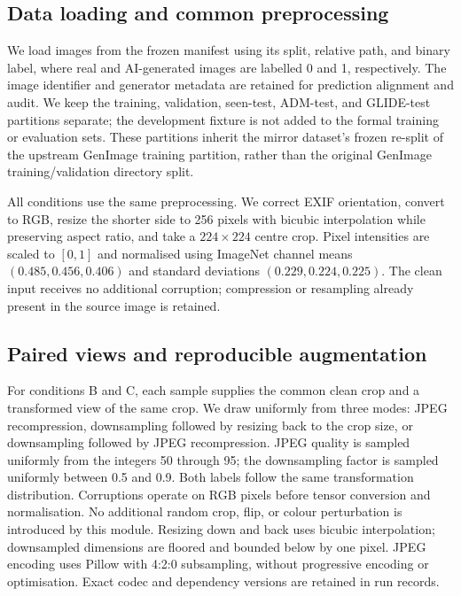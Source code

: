 
\subsection{Data loading and common preprocessing}
\label{sec:ouyang-data}
We load images from the frozen manifest using its split, relative path, and
binary label, where real and AI-generated images are labelled 0 and 1,
respectively. The image identifier and generator metadata are retained for
prediction alignment and audit. We keep the training, validation, seen-test,
ADM-test, and GLIDE-test partitions separate; the development fixture is not
added to the formal training or evaluation sets. These partitions inherit the
mirror dataset's frozen re-split of the upstream GenImage training partition,
rather than the original GenImage training/validation directory split.

All conditions use the same preprocessing. We correct EXIF orientation,
convert to RGB, resize the shorter side to 256 pixels with bicubic
interpolation while preserving aspect ratio, and take a $224\times224$ centre
crop. Pixel intensities are scaled to $[0,1]$ and normalised using ImageNet
channel means $(0.485,0.456,0.406)$ and standard deviations
$(0.229,0.224,0.225)$. The clean input receives no additional corruption;
compression or resampling already present in the source image is retained.

\subsection{Paired views and reproducible augmentation}
\label{sec:ouyang-views}
For conditions B and C, each sample supplies the common clean crop and a
transformed view of the same crop. We draw uniformly from three modes:
JPEG recompression, downsampling followed by resizing back to the crop size,
or downsampling followed by JPEG recompression. JPEG quality is sampled
uniformly from the integers 50 through 95; the downsampling factor is sampled
uniformly between 0.5 and 0.9. Both labels follow the same transformation
distribution. Corruptions operate on RGB pixels before tensor conversion and
normalisation. No additional random crop, flip, or colour perturbation is
introduced by this module. Resizing down and back uses bicubic interpolation;
downsampled dimensions are floored and bounded below by one pixel. JPEG
encoding uses Pillow with 4:2:0 subsampling, without progressive encoding or
optimisation. Exact codec and dependency versions are retained in run records.

